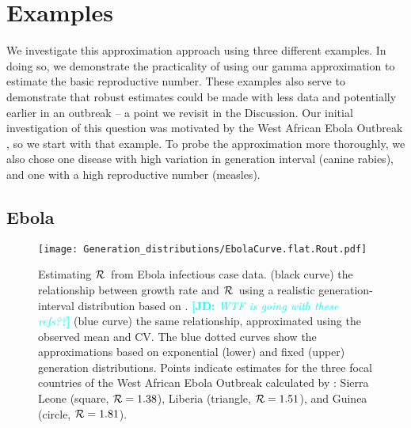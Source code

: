 \documentclass[12pt,]{article}
\newcommand{\RR}{\ensuremath{{\cal R}}}
\newcommand{\comment}[3]{\textcolor{#1}{\textbf{[#2: }\textit{#3}\textbf{]}}}
\newcommand{\jd}[1]{\comment{cyan}{JD}{#1}}
\begin{document}
\section{Examples}

We investigate this approximation approach using three different examples. 
In doing so, we demonstrate the practicality of using our gamma approximation to estimate the basic reproductive number. 
These examples also serve to demonstrate that robust estimates could be made with less data and potentially earlier in an outbreak -- a point we revisit in the Discussion.
Our initial investigation of this question was motivated by the West African Ebola Outbreak \cite{WeitDush15}, so we start with that example. To probe the approximation more thoroughly, we also chose one disease with high variation in generation interval (canine rabies), and one with a high reproductive number (measles).

\subsection{Ebola}
\label{EbolaEx}

\begin{figure}[htbp] \centering
	\texttt{[image: Generation\_distributions/EbolaCurve.flat.Rout.pdf]}
	\caption{Estimating \RR~from Ebola infectious case data.
(black curve) the relationship between growth rate and \RR~using a realistic generation-interval distribution based on \cite{AylwBarb14}.
\jd{WTF is going with these refs??}
(blue curve) the same relationship, approximated using the observed mean and CV. 
The blue dotted curves show the approximations based on exponential (lower) and fixed (upper) generation distributions.
Points indicate estimates for the three focal countries of the West African Ebola Outbreak calculated by \cite{AylwBarb14}: {Sierra Leone (square, $\RR=1.38$), Liberia (triangle, $\RR=1.51$), and Guinea (circle, $\RR=1.81$).}
	\label{fig:EbolaCurve}}
\end{figure}
\end{document}
